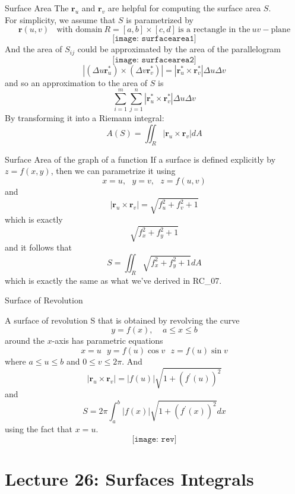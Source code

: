 \documentclass[10pt]{beamer}
\begin{document}
\begin{frame}[allowframebreaks]{Surface Area}
The $\mathbf{r}_u$ and $\mathbf{r}_v$ are helpful for computing the surface area $S$.\\
For simplicity, we assume that $S$ is parametrized by
$$\mathbf{r}(u,v)~~~~\text{with domain} ~R = [a,b]\times[c,d]~\text{is a rectangle in the}~uv-\text{plane}$$
$$\texttt{[image: surfacearea1]}$$
And the area of $S_{ij}$ could be approximated by the area of the parallelogram
$$\texttt{[image: surfacearea2]}$$
$$|(\Delta u\mathbf{r}_u^*)\times (\Delta v\mathbf{r}_v^*)| = |\mathbf{r}_u^*\times \mathbf{r}_v^*|\Delta u\Delta v$$
and so an approximation to the area of $S$ is 
$$\sum\limits_{i=1}^m\sum\limits_{j=1}^n|\mathbf{r}_u^*\times \mathbf{r}_v^*|\Delta u\Delta v$$
By transforming it into a Riemann integral:
$$A(S) = \iint_R|\mathbf{r}_u\times \mathbf{r}_v|dA$$
\end{frame}

\begin{frame}[allowframebreaks]{Surface Area of the graph of a function}
If a surface is defined explicitly by $z = f (x, y)$, then we can parametrize it using
$$x = u, ~~~y = v, ~~~z = f(u,v)$$
and $$|\mathbf{r}_u\times\mathbf{r}_v| = \sqrt{f_u^2+f_v^2+1}$$
which is exactly $$\sqrt{f_x^2+f_y^2+1}$$
and it follows that $$S = \iint_R\sqrt{f_x^2+f_y^2+1} dA$$
which is exactly the same as what we've derived in RC\_07.
\end{frame}

\begin{frame}[allowframebreaks]{Surface of Revolution}

A surface of revolution S that is obtained by revolving the curve
$$y = f(x), ~~~~~a\leq x\leq b$$
around the $x$-axis has parametric equations $$x = u~~~y=f(u)\cos v~~~z = f(u)\sin v$$
where $a\leq u\leq b$ and $0\leq v \leq 2\pi$. And $$|\mathbf{r}_u\times\mathbf{r}_v| = |f(u)|\sqrt{1 + (f^\prime(u))^2}$$
and $$S = 2\pi\int_a^b|f(x)|\sqrt{1 + (f^\prime(x))^2}dx$$
using the fact that $x = u$.
$$\texttt{[image: rev]}$$

\end{frame}


\section{Lecture 26: Surfaces Integrals}
\end{document}
